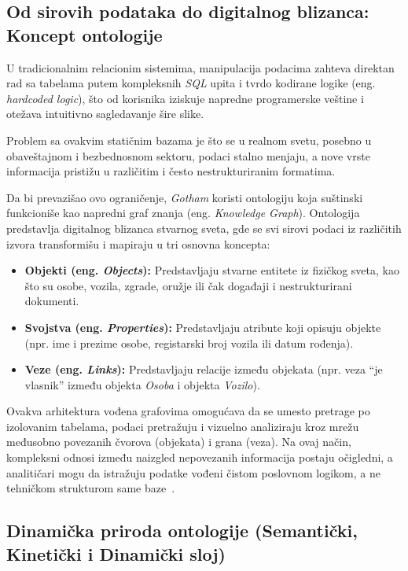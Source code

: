 ﻿\documentclass[12pt]{article}
\begin{document}
\subsection{Od sirovih podataka do digitalnog blizanca: Koncept ontologije}

U tradicionalnim relacionim sistemima, manipulacija podacima zahteva direktan rad sa tabelama putem kompleksnih \textit{SQL} upita i tvrdo kodirane logike (eng. \textit{hardcoded logic}), što od korisnika iziskuje napredne programerske veštine i otežava intuitivno sagledavanje šire slike.

Problem sa ovakvim statičnim bazama je što se u realnom svetu, posebno u obaveštajnom i bezbednosnom sektoru, podaci stalno menjaju, a nove vrste informacija pristižu u različitim i često nestrukturiranim formatima.

Da bi prevazišao ovo ograničenje, \textit{Gotham} koristi ontologiju koja suštinski funkcioniše kao napredni graf znanja (eng. \textit{Knowledge Graph}).
Ontologija predstavlja digitalnog blizanca stvarnog sveta, gde se svi sirovi podaci iz različitih izvora transformišu i mapiraju u tri osnovna koncepta:
\begin{itemize}
    \item \textbf{Objekti (eng. \textit{Objects}):} Predstavljaju stvarne entitete iz fizičkog sveta, kao što su osobe, vozila, zgrade, oružje ili čak događaji i nestrukturirani dokumenti.
    \item \textbf{Svojstva (eng. \textit{Properties}):} Predstavljaju atribute koji opisuju objekte (npr. ime i prezime osobe, registarski broj vozila ili datum rođenja).
    \item \textbf{Veze (eng. \textit{Links}):} Predstavljaju relacije između objekata (npr. veza \enquote{je vlasnik} između objekta \textit{Osoba} i objekta \textit{Vozilo}).
\end{itemize}

Ovakva arhitektura vođena grafovima omogućava da se umesto pretrage po izolovanim tabelama, podaci pretražuju i vizuelno analiziraju kroz mrežu međusobno povezanih čvorova (objekata) i grana (veza).
Na ovaj način, kompleksni odnosi između naizgled nepovezanih informacija postaju očigledni, a analitičari mogu da istražuju podatke vođeni čistom poslovnom logikom, a ne tehničkom strukturom same baze~\cite{wei2024brief}.

\subsection{Dinamička priroda ontologije (Semantički, Kinetički i Dinamički sloj)}
\end{document}
